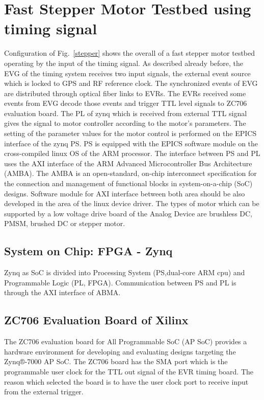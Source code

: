 \documentclass[a4paper,
              ]{jacow}
\begin{document}
\section{Fast Stepper Motor Testbed using timing signal}
Configuration of Fig.~\ref{stepper} shows the overall of a fast stepper motor testbed operating by the input of the timing signal. As described already before, the EVG of the timing system receives two input signals, the external event source which is locked to GPS and RF reference clock. The synchronized events of EVG are distributed through optical fiber links to EVRs. The EVRs received some events from EVG decode those events and trigger TTL level signals to ZC706 evaluation board. The PL of zynq which is received from external TTL signal gives the signal to motor controller according to the motor's parameters. The setting of the parameter values for the motor control is performed on the EPICS interface of the zynq PS. PS is equipped with the EPICS software module on the cross-compiled linux OS of the ARM processor. The interface between PS and PL uses the AXI interface of the ARM Advanced Microcontroller Bus Architecture (AMBA). The AMBA\cite{amba-bus} is an open-standard, on-chip interconnect specification for the connection and management of functional blocks in system-on-a-chip (SoC) designs. Software module for AXI interface between both area should be also developed in the area of the linux device driver. The types of motor which can be supported by a low voltage drive board of the Analog Device\cite{analog} are brushless DC, PMSM, brushed DC or stepper motor. 

\subsection{System on Chip: FPGA - Zynq}
Zynq\cite{xilix,zynq} as SoC is divided into Processing System (PS,dual-core ARM cpu) and  Programmable Logic (PL, FPGA). Communication between PS and PL is through the AXI interface of ABMA.

\subsection{ZC706 Evaluation Board of Xilinx}
The ZC706 evaluation board for All Programmable SoC (AP SoC) provides a hardware environment for developing and evaluating designs targeting the Zynq®-7000 AP SoC.\cite{zc706-doc} The ZC706 board has the SMA port which is the programmable user clock for the TTL out signal of the EVR timing board. The reason which selected the board is to have the user clock port to receive input from the external trigger.
\end{document}
